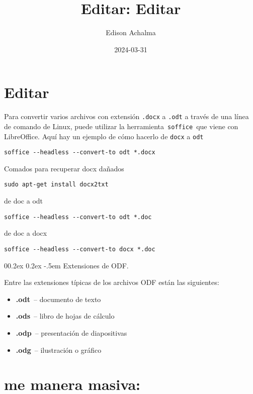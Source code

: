 \documentclass[
  jou,
  floatsintext,
  longtable,
  a4paper,
  nolmodern,
  notxfonts,
  notimes,
  colorlinks=true,linkcolor=blue,citecolor=blue,urlcolor=blue]{apa7}
\title{Editar: Editar}
\author{Edison Achalma}
\affiliation{
{Escuela Profesional de Economía, Universidad Nacional de San Cristóbal
de Huamanga}}
\date{2024-03-31}
\makeatletter
\renewcommand{\paragraph}{\@startsection{paragraph}{4}{\parindent}%
	{0\baselineskip \@plus 0.2ex \@minus 0.2ex}%
	{-.5em}%
	{\normalfont\normalsize\bfseries\typesectitle}}
\providecommand{\tightlist}{%
  \setlength{\itemsep}{0pt}\setlength{\parskip}{0pt}}
\makeatother
\begin{document}
\maketitle

\hypertarget{toc}{}
\tableofcontents
\newpage
\section[Introduction]{Editar}

\setcounter{secnumdepth}{5}

\setlength\LTleft{0pt}


Para convertir varios archivos con extensión \texttt{.docx} a
\texttt{.odt} a través de una línea de comando de Linux, puede utilizar
la herramienta~\texttt{soffice}~que viene con LibreOffice. Aquí hay un
ejemplo de cómo hacerlo de \texttt{docx} a \texttt{odt}

\texttt{soffice\ -\/-headless\ -\/-convert-to\ odt\ *.docx}

Comados para recuperar docx dañados

\texttt{sudo\ apt-get\ install\ docx2txt}

de doc a odt

\texttt{soffice\ -\/-headless\ -\/-convert-to\ odt\ *.doc}

de doc a docx

\texttt{soffice\ -\/-headless\ -\/-convert-to\ docx\ *.doc}

\paragraph{Extensiones de ODF.}\label{extensiones-de-odf}

Entre las extensiones típicas de los archivos ODF están las siguientes:

\begin{itemize}
\tightlist
\item
  \textbf{.odt}~-- documento de texto
\item
  \textbf{.ods}~-- libro de hojas de cálculo
\item
  \textbf{.odp}~-- presentación de diapositivas
\item
  \textbf{.odg}~-- ilustración o gráfico
\end{itemize}

\section{me manera masiva:}\label{me-manera-masiva}
\end{document}
